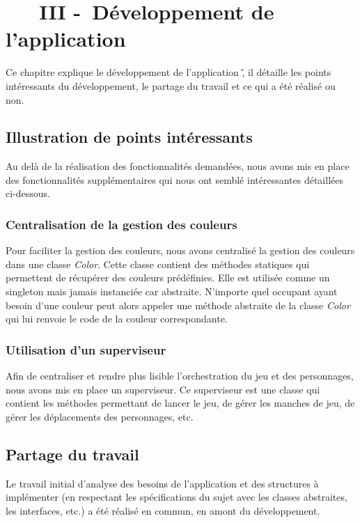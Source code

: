 \chapter[~~~DÉVELOPPEMENT]{~~~III -~Développement de l’application}%
\label{refDev3}%

Ce chapitre explique le développement de l'application \nom\~, il détaille les points intéressants du développement, le partage du travail et ce qui a été réalisé ou non.

\section{Illustration de points intéressants}

Au delà de la réalisation des fonctionnalités demandées, nous avons mis en place des fonctionnalités supplémentaires qui nous ont semblé intéressantes détaillées ci-dessous.

\subsection{Centralisation de la gestion des couleurs}

Pour faciliter la gestion des couleurs, nous avons centralisé la gestion des couleurs dans une classe \emph{Color}. Cette classe contient des méthodes statiques qui permettent de récupérer des couleurs prédéfinies. 
Elle est utilisée comme un singleton mais jamais instanciée car abstraite.
N'importe quel occupant ayant besoin d'une couleur peut alors appeler une méthode abstraite de la classe \emph{Color} qui lui renvoie le code de la couleur correspondante.

\subsection{Utilisation d'un superviseur}

Afin de centraliser et rendre plus lisible l'orchestration du jeu et des personnages, nous avons mis en place un superviseur. Ce superviseur est une classe qui contient les méthodes permettant de lancer le jeu, de gérer les manches de jeu, de gérer les déplacements des personnages, etc.

\section{Partage du travail}

Le travail initial d'analyse des besoins de l'application et des structures à implémenter (en respectant les spécifications du sujet avec les classes abstraites, les interfaces, etc.) a été réalisé en commun, en amont du développement.

